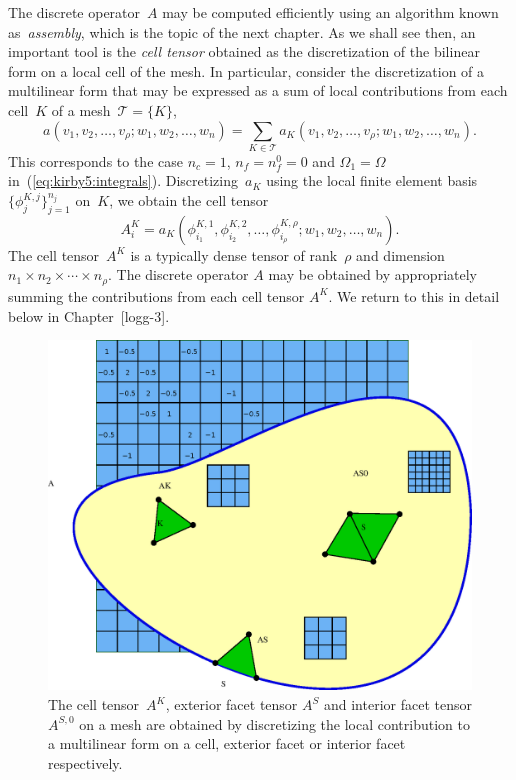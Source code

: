 The discrete operator~$A$ may be computed efficiently using an
algorithm known as~\emph{assembly}, which is the topic of the next
chapter. As we shall see then, an important tool is the \emph{cell
  tensor} obtained as the discretization of the bilinear form on a
local cell of the mesh. In particular, consider the discretization of
a multilinear form that may be expressed as a sum of local
contributions from each cell~$K$ of a mesh~$\mathcal{T} = \{K\}$,
\begin{displaymath}
  a(v_1, v_2, \ldots, v_{\rho}; w_1, w_2, \ldots, w_n)
  = \sum_{K\in\mathcal{T}} a_K(v_1, v_2, \ldots, v_{\rho}; w_1, w_2, \ldots, w_n).
\end{displaymath}
This corresponds to the case $n_c = 1$, $n_f = n_f^0 = 0$ and $\Omega_1
= \Omega$ in~(\ref{eq:kirby5:integrals}). Discretizing~$a_K$ using the
local finite element basis~$\{\phi^{K,j}_j\}_{j=1}^{n_j}$ on~$K$, we
obtain the cell tensor
\begin{equation} \label{eq:kirby5:celltensor}
  A^K_i
  = a_K(\phi^{K,1}_{i_1}, \phi^{K,2}_{i_2}, \ldots, \phi^{K,\rho}_{i_{\rho}}; w_1, w_2, \ldots, w_n).
\end{equation}
The cell tensor~$A^K$ is a typically dense tensor of rank~$\rho$ and
dimension $n_1 \times n_2 \times \cdots \times n_{\rho}$.  The
discrete operator $A$ may be obtained by appropriately summing the
contributions from each cell tensor $A^K$. We return to this in detail
below in Chapter~[logg-3].

\begin{figure}
  \begin{center}
    \includegraphics[width=\largewidth]{chapters/kirby-5/eps/element_tensors.eps}
    \caption{The cell tensor~$A^K$, exterior facet tensor $A^S$ and
      interior facet tensor $A^{S,0}$ on a mesh are obtained by
      discretizing the local contribution to a multilinear form on a
      cell, exterior facet or interior facet
      respectively.}
    \label{fig:kirby5:tensors}
  \end{center}
\end{figure}


